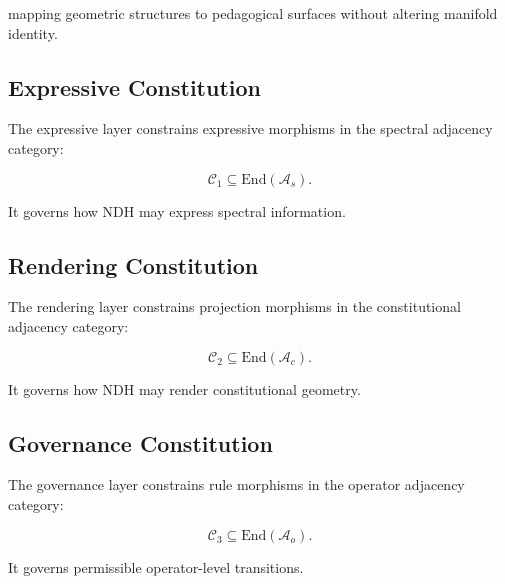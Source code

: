 mapping geometric structures to pedagogical surfaces without altering
manifold identity.


\subsection{Expressive Constitution}

The expressive layer constrains expressive morphisms in the spectral
adjacency category:

\[
\mathcal{C}_1 \subseteq \mathrm{End}(\mathcal{A}_s).
\]

It governs how NDH may express spectral information.


\subsection{Rendering Constitution}

The rendering layer constrains projection morphisms in the constitutional
adjacency category:

\[
\mathcal{C}_2 \subseteq \mathrm{End}(\mathcal{A}_c).
\]

It governs how NDH may render constitutional geometry.


\subsection{Governance Constitution}

The governance layer constrains rule morphisms in the operator adjacency
category:

\[
\mathcal{C}_3 \subseteq \mathrm{End}(\mathcal{A}_o).
\]

It governs permissible operator-level transitions.


